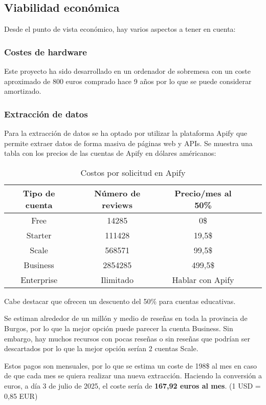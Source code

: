 \subsection{Viabilidad económica}

Desde el punto de vista económico, hay varios aspectos a tener en cuenta:

\subsubsection{Costes de hardware}

Este proyecto ha sido desarrollado en un ordenador de sobremesa con un coste aproximado de 800 euros comprado hace 9 años por lo que se puede considerar amortizado.

\subsubsection{Extracción de datos}

Para la extracción de datos se ha optado por utilizar la plataforma Apify que permite extraer datos de forma masiva de páginas web y APIs.
Se muestra una tabla con los precios de las cuentas de Apify\cite{apify:pricing} en dólares américanos:
\begin{table}[H]
    \centering
    \begin{tabular}{|c|c|c|c|c|}
        \hline
        \textbf{Tipo de cuenta} & \textbf{Número de reviews} & \textbf{Precio/mes al 50\%} \\
        \hline
        Free & 14285 & 0\$ \\
        Starter & 111428 & 19,5\$ \\
        Scale & 568571 & 99,5\$ \\
        Business & 2854285 & 499,5\$ \\
        Enterprise & Ilimitado & Hablar con Apify \\
        \hline
    \end{tabular}
    \caption{Costos por solicitud en Apify}
\end{table}
Cabe destacar que ofrecen un descuento del 50\% para cuentas educativas.

Se estiman alrededor de un millón y medio de reseñas en toda la provincia de Burgos, por lo que la mejor opción puede parecer la cuenta Business.
Sin embargo, hay muchos recursos con pocas reseñas o sin reseñas que podrían ser descartados por lo que la mejor opción serían 2 cuentas Scale.

Estos pagos son mensuales, por lo que se estima un coste de 198\$ al mes en caso de que cada mes se quiera realizar una nueva extracción.
Haciendo la conversión a euros, a día 3 de julio de 2025, el coste sería de \textbf{167,92 euros al mes}. (1 USD = 0,85 EUR)

